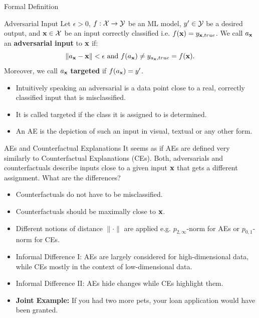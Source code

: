 \documentclass[11pt,compress,t,notes=noshow, xcolor=table]{beamer}
\begin{document}
\begin{vbframe}{Formal Definition}
\begin{block}{Adversarial Input}
Let $\epsilon>0$, $f:\Xspace \rightarrow \Yspace$ be an ML model, $y'\in \Yspace$ be a desired output, and $\xv \in \Xspace$ be an input correctly classified i.e. $f(\xv)=y_{\xv,true}$. We call $a_{\xv}$ an \textbf{adversarial input} to $\xv$ if:
\begin{equation*}
    \| a_{\xv}- \xv\|<\epsilon\text{ and } f(a_{\xv})\neq y_{a_{\xv},true}=f(\xv).
\end{equation*}
Moreover, we call $a_{\xv}$ \textbf{targeted} if $f(a_{\xv})=y'$.
\end{block}
\begin{itemize}
    \item Intuitively speaking an adversarial is a data point close to a real, correctly classified input that is misclassified.
    \item It is called targeted if the class it is assigned to is determined.
    \item An AE is the depiction of such an input in visual, textual or any other form. 
\end{itemize}
\end{vbframe}


\begin{vbframe}{AEs and Counterfactual Explanations}
It seems as if AEs are defined very similarly to Counterfactual Explanations (CEs). Both, adversarials and counterfactuals describe inputs close to a given input $\xv$ that gets a different assignment. What are the differences?
\begin{itemize}
    \item Counterfactuals do not have to be misclassified.
    \item Counterfactuals should be maximally close to $\xv$.
    \item Different notions of distance $\|\cdot\|$ are applied e.g. $p_{2,\infty}$-norm for AEs or $p_{0,1}$-norm for CEs.
    \item Informal Difference I: AEs are largely considered for high-dimensional data, while CEs mostly in the context of low-dimensional data.
    \item Informal Difference II: AEs hide changes while CEs highlight them.
    \item \textbf{Joint Example:} If you had two more pets, your loan application would have been granted.
\end{itemize}
\end{vbframe}
\end{document}
